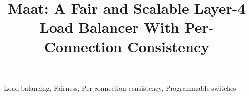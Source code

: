 \documentclass[conference]{IEEEtran}
\begin{document}
\title{Maat: A Fair and Scalable Layer-4 Load Balancer With Per-Connection Consistency
}

\author{
}


\maketitle



\begin{IEEEkeywords}
Load balancing, Fairness, Per-connection consistency, Programmable switches
\end{IEEEkeywords}














\end{document}
